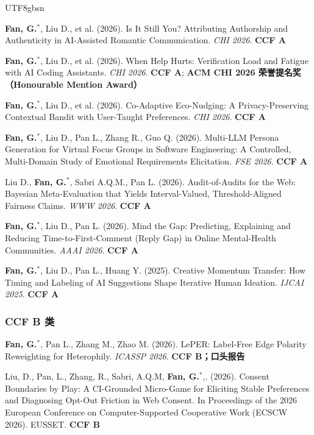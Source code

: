 \documentclass[a4paper,10pt]{article}
\newcommand{\pubitem}[1]{\item #1}
\begin{document}
\begin{CJK*}{UTF8}{gbsn}
\begin{enumerate}[label={[C\arabic*]}]
    \pubitem{\textbf{Fan, G.}$^*$, Liu D., et al. (2026). Is It Still You? Attributing Authorship and Authenticity in AI-Assisted Romantic Communication. \textit{CHI 2026}. \textbf{CCF A}}
    
    \pubitem{\textbf{Fan, G.}$^*$, Liu D., et al. (2026). When Help Hurts: Verification Load and Fatigue with AI Coding Assistants. \textit{CHI 2026}. \textbf{CCF A}; \textbf{ACM CHI 2026 荣誉提名奖（Honourable Mention Award）}}
    
    \pubitem{\textbf{Fan, G.}$^*$, Liu D., et al. (2026). Co-Adaptive Eco-Nudging: A Privacy-Preserving Contextual Bandit with User-Taught Preferences. \textit{CHI 2026}. \textbf{CCF A}}
    
    \pubitem{\textbf{Fan, G.}$^*$, Liu D., Pan L., Zhang R., Guo Q. (2026). Multi-LLM Persona Generation for Virtual Focus Groups in Software Engineering: A Controlled, Multi-Domain Study of Emotional Requirements Elicitation. \textit{FSE 2026}. \textbf{CCF A}}
    
    \pubitem{Liu D., \textbf{Fan, G.}$^*$, Sabri A.Q.M., Pan L. (2026). Audit-of-Audits for the Web: Bayesian Meta-Evaluation that Yields Interval-Valued, Threshold-Aligned Fairness Claims. \textit{WWW 2026}. \textbf{CCF A}}
    
    \pubitem{\textbf{Fan, G.}$^*$, Liu D., Pan L. (2026). Mind the Gap: Predicting, Explaining and Reducing Time-to-First-Comment (Reply Gap) in Online Mental-Health Communities. \textit{AAAI 2026}. \textbf{CCF A}}
    
    \pubitem{\textbf{Fan, G.}$^*$, Liu D., Pan L., Huang Y. (2025). Creative Momentum Transfer: How Timing and Labeling of AI Suggestions Shape Iterative Human Ideation. \textit{IJCAI 2025}. \textbf{CCF A}}
\end{enumerate}

\subsubsection*{CCF B 类}

\begin{enumerate}[label={[C\arabic*]}, resume]
    \pubitem{\textbf{Fan, G.}$^*$, Pan L., Zhang M., Zhao M. (2026). LePER: Label-Free Edge Polarity Reweighting for Heterophily. \textit{ICASSP 2026}. \textbf{CCF B；口头报告}}
    \pubitem{Liu, D., Pan, L., Zhang, R., Sabri, A.Q.M, \textbf{Fan, G.}$^*$,. (2026). Consent Boundaries by Play: A CI-Grounded Micro-Game for Eliciting Stable Preferences and Diagnosing Opt-Out Friction in Web Consent. In Proceedings of the 2026 European Conference on Computer-Supported Cooperative Work (ECSCW 2026). EUSSET. \textbf{CCF B}}
    


\end{enumerate}
\end{CJK*}
\end{document}
